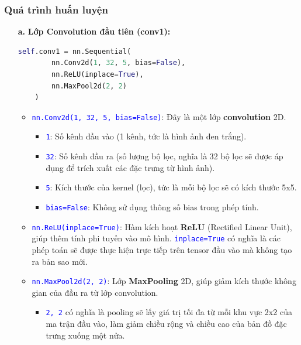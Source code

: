 \subsubsection{Quá trình huấn luyện}
\begin{enumerate}
    \item[\textbf{a.}] \textbf{Lớp Convolution đầu tiên (conv1):}

\begin{lstlisting}[language=python]
    self.conv1 = nn.Sequential(
        nn.Conv2d(1, 32, 5, bias=False),
        nn.ReLU(inplace=True),
        nn.MaxPool2d(2, 2)
    )
\end{lstlisting}


\begin{itemize}
    \item \textcolor{blue}{\texttt{nn.Conv2d(1, 32, 5, bias=False)}}: Đây là một lớp \textbf{convolution} 2D.
    \begin{itemize}
        \item \textcolor{blue}{\texttt{1}}: Số kênh đầu vào (1 kênh, tức là hình ảnh đen trắng).
        \item \textcolor{blue}{\texttt{32}}: Số kênh đầu ra (số lượng bộ lọc, nghĩa là 32 bộ lọc sẽ được áp dụng để trích xuất các đặc trưng từ hình ảnh).
        \item \textcolor{blue}{\texttt{5}}: Kích thước của kernel (lọc), tức là mỗi bộ lọc sẽ có kích thước 5x5.
        \item \textcolor{blue}{\texttt{bias=False}}: Không sử dụng thông số bias trong phép tính.
    \end{itemize}

    \item \textcolor{blue}{\texttt{nn.ReLU(inplace=True)}}: Hàm kích hoạt \textbf{ReLU} (Rectified Linear Unit), giúp thêm tính phi tuyến vào mô hình. \textcolor{blue}{\texttt{inplace=True}} có nghĩa là các phép toán sẽ được thực hiện trực tiếp trên tensor đầu vào mà không tạo ra bản sao mới.

    \item \textcolor{blue}{\texttt{nn.MaxPool2d(2, 2)}}: Lớp \textbf{MaxPooling} 2D, giúp giảm kích thước không gian của đầu ra từ lớp convolution.
    \begin{itemize}
        \item \textcolor{blue}{\texttt{2, 2}} có nghĩa là pooling sẽ lấy giá trị tối đa từ mỗi khu vực 2x2 của ma trận đầu vào, làm giảm chiều rộng và chiều cao của bản đồ đặc trưng xuống một nửa.
    \end{itemize}
\end{itemize}


\end{enumerate}

